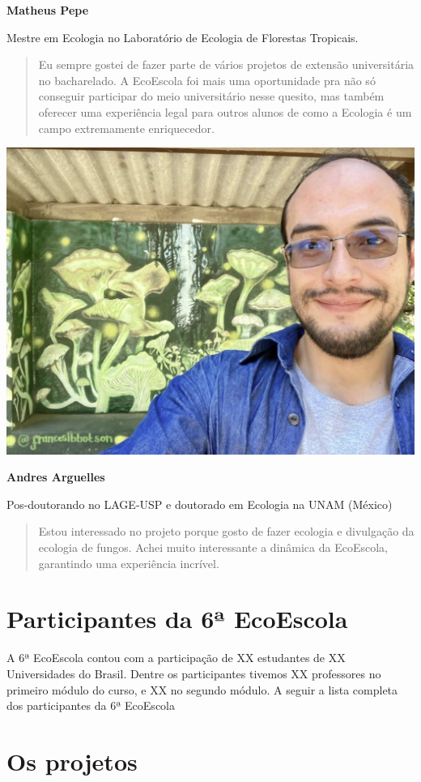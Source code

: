 \documentclass[
]{book}
\begin{document}
\textbf{Matheus Pepe}

Mestre em Ecologia no Laboratório de Ecologia de Florestas Tropicais.

\begin{quote}
Eu sempre gostei de fazer parte de vários projetos de extensão universitária no bacharelado. A EcoEscola foi mais uma oportunidade pra não só conseguir participar do meio universitário nesse quesito, mas também oferecer uma experiência legal para outros alunos de como a Ecologia é um campo extremamente enriquecedor.
\end{quote}

\begin{center}\includegraphics[width=0.5\linewidth]{figs/andres_picture} \end{center}

\textbf{Andres Arguelles}

Pos-doutorando no LAGE-USP e doutorado em Ecologia na UNAM (México)

\begin{quote}
Estou interessado no projeto porque gosto de fazer ecologia e divulgação da ecologia de fungos. Achei muito interessante a dinâmica da EcoEscola, garantindo uma experiência incrível.
\end{quote}

\chapter{Participantes da 6ª EcoEscola}\label{participantes-da-6uxaa-ecoescola}

A 6ª EcoEscola contou com a participação de XX estudantes de XX Universidades do Brasil. Dentre os participantes tivemos XX professores no primeiro módulo do curso, e XX no segundo módulo. A seguir a lista completa dos participantes da 6ª EcoEscola

\chapter{Os projetos}\label{os-projetos}
\end{document}

